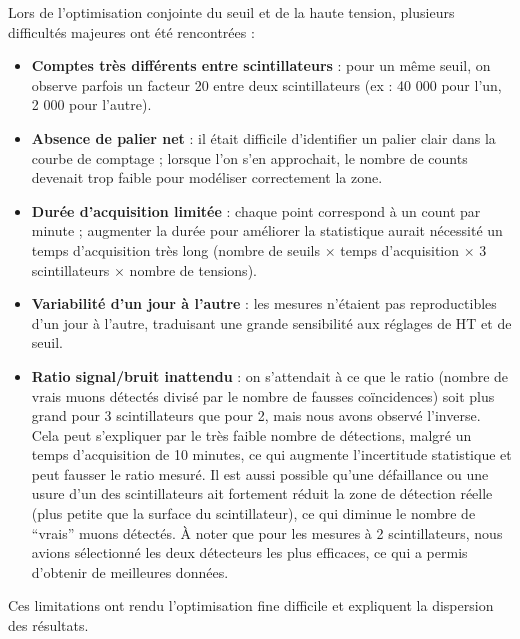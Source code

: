 \documentclass[a4paper,12pt,twoside]{article}
\begin{document}

\vspace{1em}
\begin{center}
\begin{tcolorbox}[colback=red!5!white, colframe=red!80!black, title=Problèmes rencontrés lors de l'optimisation]
Lors de l’optimisation conjointe du seuil et de la haute tension, plusieurs difficultés majeures ont été rencontrées :
\begin{itemize}
    \item \textbf{Comptes très différents entre scintillateurs} : pour un même seuil, on observe parfois un facteur 20 entre deux scintillateurs (ex : 40 000 pour l’un, 2 000 pour l’autre).
    \item \textbf{Absence de palier net} : il était difficile d’identifier un palier clair dans la courbe de comptage ; lorsque l’on s’en approchait, le nombre de counts devenait trop faible pour modéliser correctement la zone.
    \item \textbf{Durée d’acquisition limitée} : chaque point correspond à un count par minute ; augmenter la durée pour améliorer la statistique aurait nécessité un temps d’acquisition très long (nombre de seuils $\times$ temps d’acquisition $\times$ 3 scintillateurs $\times$ nombre de tensions).
    \item \textbf{Variabilité d’un jour à l’autre} : les mesures n’étaient pas reproductibles d’un jour à l’autre, traduisant une grande sensibilité aux réglages de HT et de seuil.
    \item \textbf{Ratio signal/bruit inattendu} : on s’attendait à ce que le ratio (nombre de vrais muons détectés divisé par le nombre de fausses coïncidences) soit plus grand pour 3 scintillateurs que pour 2, mais nous avons observé l’inverse. Cela peut s’expliquer par le très faible nombre de détections, malgré un temps d’acquisition de 10 minutes, ce qui augmente l’incertitude statistique et peut fausser le ratio mesuré. Il est aussi possible qu’une défaillance ou une usure d'un des scintillateurs ait fortement réduit la zone de détection réelle (plus petite que la surface du scintillateur), ce qui diminue le nombre de “vrais” muons détectés. À noter que pour les mesures à 2 scintillateurs, nous avions sélectionné les deux détecteurs les plus efficaces, ce qui a permis d’obtenir de meilleures données.
\end{itemize}
Ces limitations ont rendu l’optimisation fine difficile et expliquent la dispersion des résultats.
\end{tcolorbox}
\end{center}
\end{document}
